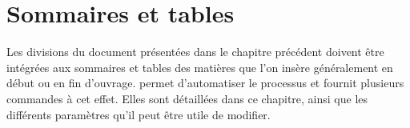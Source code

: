 \begin{noprint}
\newcommand{\subpara}[1][]{%
	\refstepcounter{subpara}%
	\subparaskip%
	{\subparanumcolour\subparanumstyle{\thepara\subparanumdash\thesubpara\subparanumsep}%
	 \if\relax#1\relax\label{para:\thepara-\thesubpara}\else\label{para:#1}\fi}%
	\if@paraname
		\if\relax#1\relax\else%
			\if@marginalia%
				\marginpar{\subparacolour\subparastyle{#1}}%
			\else%
				{\subparacolour\subparatitlestyle{#1\subparasep}}%
	\fi\fi\fi	%
	\if\relax#1\relax\else
		\refstepcounter{precis}
		\addtocontents{toc}{%
			\protect\if@subprecis%
				\ifnum\value{precis}>1\cftprecissep\else\cftbeforeprecis\fi%
				{\cftprecisstyle{%
	 				\cftprecisnumstyle\thepara%
	 				\subparanumdash\thesubpara\cftprecisaftersnum}
				#1\cftprecisnumsep\cftprecisleader\thepage\cftprecisafterpnum}%
			\protect\fi%
			\protect\@ifnextchar\protect\contentsline{\protect\cftafterprecis}{}%
			}%
	\fi
	\@ifnextchar\par{\@gobblepar\relax}{\relax}}
\end{noprint}





\chapter{Sommaires et tables}\label{tables-of-contents}




Les divisions du document présentées dans le chapitre précédent doivent être intégrées aux sommaires et tables des matières que l'on insère généralement en début ou en fin d'ouvrage. \frenchlaw permet d'automatiser le processus et fournit plusieurs commandes à cet effet. Elles sont détaillées dans ce chapitre, ainsi que les différents paramètres qu'il peut être utile de modifier.

